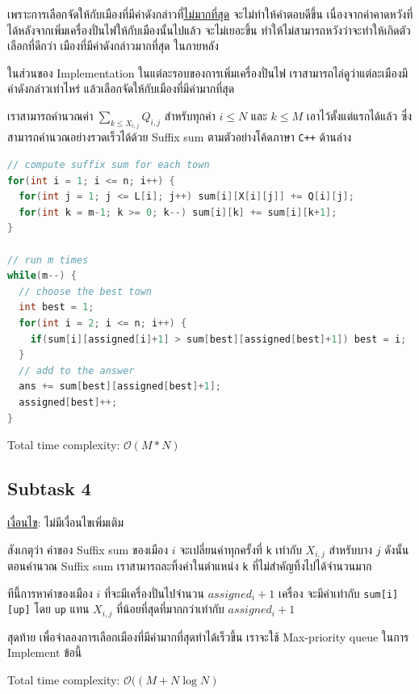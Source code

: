 \documentclass[12pt]{article}
\newcommand{\code}[1]{\texttt{\scriptsize{#1}}}
\begin{document}
เพราะการเลือกจัดให้กับเมืองที่มีค่าดังกล่าวที่\underline{ไม่มากที่สุด} จะไม่ทำให้คำตอบดีขึ้น เนื่องจากค่าคาดหวังที่ได้หลังจากเพิ่มเครื่องปั่นไฟให้กับเมืองนั้นไปแล้ว จะไม่เยอะขึ้น ทำให้ไม่สามารถหวังว่าจะทำให้เกิดตัวเลือกที่ดีกว่า เมืองที่มีค่าดังกล่าวมากที่สุด ในภายหลัง

ในส่วนของ Implementation ในแต่ละรอบของการเพิ่มเครื่องปั่นไฟ เราสามารถไล่ดูว่าแต่ละเมืองมีค่าดังกล่าวเท่าไหร่ แล้วเลือกจัดให้กับเมืองที่มีค่ามากที่สุด

เราสามารถคำนวณค่า $\sum_{k \leq X_{i,j}} Q_{i,j}$ สำหรับทุกค่า $i \leq N$ และ  $k \leq M$ เอาไว้ตั้งแต่แรกได้แล้ว ซึ่งสามารถคำนวณอย่างรวดเร็วได้ด้วย Suffix sum ตามตัวอย่างโค้ดภาษา \texttt{\scriptsize{C++}} ด้านล่าง

\begin{lstlisting}[language=C++]
// compute suffix sum for each town
for(int i = 1; i <= n; i++) {
  for(int j = 1; j <= L[i]; j++) sum[i][X[i][j]] += Q[i][j];
  for(int k = m-1; k >= 0; k--) sum[i][k] += sum[i][k+1];
}

// run m times
while(m--) {
  // choose the best town
  int best = 1;
  for(int i = 2; i <= n; i++) {
    if(sum[i][assigned[i]+1] > sum[best][assigned[best]+1]) best = i;
  }
  // add to the answer
  ans += sum[best][assigned[best]+1];
  assigned[best]++;
}
\end{lstlisting}

Total time complexity: $\mathcal{O}(M * N)$

\subsection{Subtask 4}

\underline{เงื่อนไข}: ไม่มีเงื่อนไขเพิ่มเติม

สังเกตุว่า ค่าของ Suffix sum ของเมือง $i$ จะเปลี่ยนค่าทุกครั้งที่ \code{k} เท่ากับ $X_{i,j}$ สำหรับบาง $j$ ดังนั้นตอนคำนวณ Suffix sum เราสามารถละทิ้งค่าในตำแหน่ง \code{k} ที่ไม่สำคัญทิ้งไปได้จำนวนมาก

ทีนี้การหาค่าของเมือง $i$ ที่จะมีเครื่องปั่นไปจำนวน $assigned_i + 1$ เครื่อง จะมีค่าเท่ากับ \texttt{\scriptsize{sum[i][up]}} โดย \texttt{\scriptsize{up}} แทน $X_{i,j}$ ที่น้อยที่สุดที่มากกว่าเท่ากับ $assigned_i + 1$ 

สุดท้าย เพื่อจำลองการเลือกเมืองที่มีค่ามากที่สุดทำได้เร็วขึ้น เราจะใช้ Max-priority queue ในการ Implement ข้อนี้

Total time complexity: $\mathcal{O}((M+N \log N)$
\end{document}

